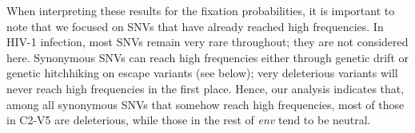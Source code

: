 \documentclass[rmp, twocolumn]{revtex4}
\newcommand{\env}{\textit{env}}
\newcommand{\shankaregion}{C2-V5}
\begin{document}
When interpreting these results for the fixation probabilities, it is important
to note that we focused on SNVs that have already reached high frequencies. In
HIV-1 infection, most SNVs remain very rare throughout; they are not considered
here. Synonymous SNVs can reach high frequencies either through genetic
drift or genetic hitchhiking on escape variants (see below); very deleterious
variants will never reach high frequencies in the first place. Hence, our
analysis indicates that, among all synonymous SNVs that somehow reach high
frequencies, most of those in \shankaregion{} are deleterious, while
those in the rest of \env{} tend to be neutral.

\begin{figure}
\begin{center}
\\
\end{center}
\end{figure}
\end{document}
